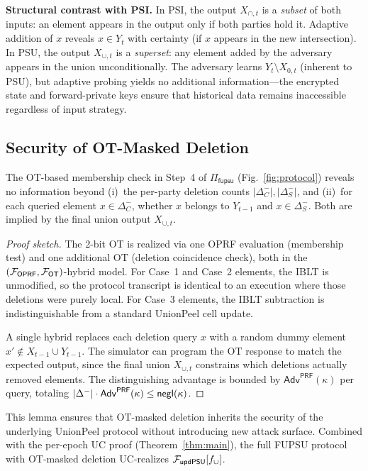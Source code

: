 \smallskip\noindent\textbf{Structural contrast with PSI.}
In PSI, the output $X_{\cap,t}$ is a \emph{subset} of both inputs: an element
appears in the output only if both parties hold it. Adaptive addition of $x$
reveals $x \in Y_t$ with certainty (if $x$ appears in the new intersection).
In PSU, the output $X_{\cup,t}$ is a \emph{superset}: any element added by the
adversary appears in the union unconditionally. The adversary learns
$Y_t \setminus X_{0,t}$ (inherent to PSU), but adaptive probing yields no
additional information---the encrypted state and forward-private keys ensure
that historical data remains inaccessible regardless of input strategy.

\subsection{Security of OT-Masked Deletion}

\begin{lemma}\label{lem:otmask}
The OT-based membership check in Step~4 of $\Pi_{\mathsf{fupsu}}$ (Fig.~\ref{fig:protocol})
reveals no information beyond (i)~the per-party deletion counts $|\Delta^-_C|, |\Delta^-_S|$, and
(ii)~for each queried element $x \in \Delta^-_C$, whether $x$ belongs to $Y_{t-1}$
and $x \in \Delta^-_S$. Both are implied by the final union output $X_{\cup,t}$.
\end{lemma}

\begin{proof}[Proof sketch]
The 2-bit OT is realized via one OPRF evaluation (membership test) and one
additional OT (deletion coincidence check), both in the
$(\mathcal{F}_{\mathsf{OPRF}}, \mathcal{F}_{\mathsf{OT}})$-hybrid model. For Case~1 and Case~2
elements, the IBLT is unmodified, so the protocol transcript is identical to
an execution where those deletions were purely local. For Case~3 elements, the
IBLT subtraction is indistinguishable from a standard UnionPeel cell update.

A single hybrid replaces each deletion query $x$ with a random dummy element
$x' \notin X_{t-1} \cup Y_{t-1}$. The simulator can program the OT response
to match the expected output, since the final union $X_{\cup,t}$ constrains
which deletions actually removed elements. The distinguishing advantage is
bounded by $\mathsf{Adv}^{\mathsf{PRF}}(\kappa)$ per query, totaling
$|\Delta^-| \cdot \mathsf{Adv}^{\mathsf{PRF}}(\kappa) \leq \mathsf{negl}(\kappa)$.
\end{proof}

This lemma ensures that OT-masked deletion inherits the security of the
underlying UnionPeel protocol without introducing new attack surface. Combined
with the per-epoch UC proof (Theorem~\ref{thm:main}), the full FUPSU protocol
with OT-masked deletion UC-realizes $\mathcal{F}_{\mathsf{updPSU}}[f_{\cup}]$.


